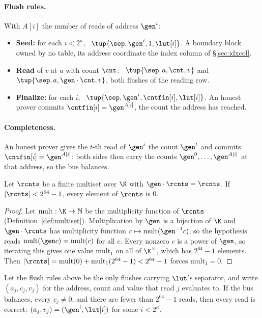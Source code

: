 \paragraph{Flush rules.} With $A[i]$ the number of reads of address $\gen^{i}$:
\begin{itemize}
\item \textbf{Seed:} for each $i<2^{\kappa}$, \push\ $\tup{\sep,\gen^{i},1,\lut[i]}$. A boundary block owned by no table, its address coordinate the index column of \S\ref{sec:idxcol}.
\item \textbf{Read} of $v$ at $a$ with count $\cnt$: \pull\ $\tup{\sep,a,\cnt,v}$ and \push\ $\tup{\sep,a,\gen\cdot\cnt,v}$, both flushes of the reading row.
\item \textbf{Finalize:} for each $i$, \pull\ $\tup{\sep,\gen^{i},\cntfin[i],\lut[i]}$. An honest prover commits $\cntfin[i]=\gen^{A[i]}$, the count the address has reached.
\end{itemize}

\paragraph{Completeness.} An honest prover gives the $t$-th read of $\gen^{i}$ the count $\gen^{t}$ and commits $\cntfin[i]=\gen^{A[i]}$: both sides then carry the counts $\gen^{0},\dots,\gen^{A[i]}$ at that address, so the bus balances.

\begin{lemma}\label{lem:invcnt}
Let $\rcnts$ be a finite multiset over $\K$ with $\gen\cdot\rcnts=\rcnts$. If $|\rcnts|<2^{64}-1$, every element of $\rcnts$ is $0$.
\end{lemma}

\begin{proof}
Let $\mathrm{mult}:\K\to\mathbb{N}$ be the multiplicity function of $\rcnts$ (Definition~\ref{def:multiset}). Multiplication by $\gen$ is a bijection of $\K$ and $\gen\cdot\rcnts$ has multiplicity function $c\mapsto\mathrm{mult}(\gen^{-1}c)$, so the hypothesis reads $\mathrm{mult}(\gen c)=\mathrm{mult}(c)$ for all $c$. Every nonzero $c$ is a power of $\gen$, so iterating this gives one value $\mathrm{mult}_1$ on all of $\K^{\times}$, which has $2^{64}-1$ elements. Then $|\rcnts|=\mathrm{mult}(0)+\mathrm{mult}_1(2^{64}-1)<2^{64}-1$ forces $\mathrm{mult}_1=0$.
\end{proof}

\begin{theorem}\label{thm:omc}
Let the flush rules above be the only flushes carrying $\lut$'s separator, and write $(a_j,c_j,v_j)$ for the address, count and value that read $j$ evaluates to. If the bus balances, every $c_j\neq0$, and there are fewer than $2^{64}-1$ reads, then every read is correct: $(a_j,v_j)=(\gen^{i},\lut[i])$ for some $i<2^{\kappa}$.
\end{theorem}

